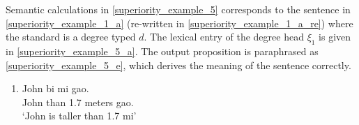 \documentclass{ctexart}
\begin{document}
Semantic calculations in \ref{superiority_example_5} corresponds to the sentence in \ref{superiority_example_1_a} (re-written in \ref{superiority_example_1_a_re}) where the standard is a degree typed $d$. The lexical entry of the degree head $\xi_1$ is given in \ref{superiority_example_5_a}. The output proposition is paraphrased as \ref{superiority_example_5_e}, which derives the meaning of the sentence correctly.

\begin{enumerate}
    \item \label{superiority_example_1_a_re}
    John bi \enspace {} mi \enspace \enspace \enspace gao. \\
    John than 1.7 meters gao. \\
    `John is taller than 1.7 mi' 
\end{enumerate}
\end{document}
